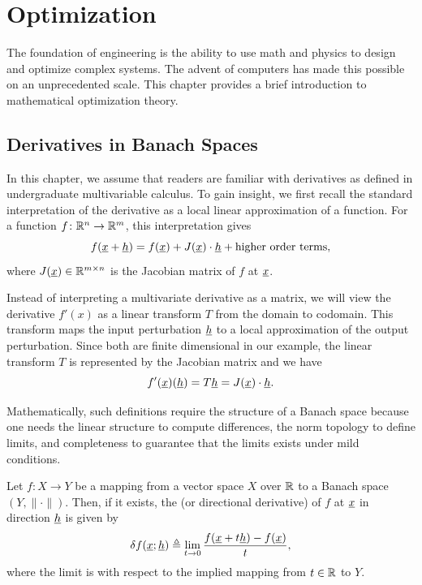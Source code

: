 \chapter{Optimization}



The foundation of engineering is the ability to use math and physics to design and optimize complex systems.
The advent of computers has made this possible on an unprecedented scale.
This chapter provides a brief introduction to mathematical optimization theory.

\section{Derivatives in Banach Spaces}

In this chapter, we assume that readers are familiar with derivatives as defined in undergraduate multivariable calculus.
To gain insight, we first recall the standard interpretation of the derivative as a local linear approximation of a function.
For a function $f\colon \mathbb{R}^n \to \mathbb{R}^m$, this interpretation gives 
\[ f(\underline{x} + \underline{h}) = f(\underline{x}) + J(\underline{x}) \cdot \underline{h} + \text{higher order terms}, \]
where $J(\underline{x})\in \mathbb{R}^{m\times n}$ is the Jacobian matrix of $f$ at $\underline{x}$.

Instead of interpreting a multivariate derivative as a matrix,  we will view the derivative $f'(x)$ as a linear transform $T$ from the domain to codomain.
This transform maps the input perturbation $\underline{h}$ to a local approximation of the output perturbation.
Since both are finite dimensional in our example, the linear transform $T$ is represented by the Jacobian matrix and we have $$f'(\underline{x})(\underline{h}) = T \underline{h} = J(\underline{x})\cdot \underline{h}.$$ 

Mathematically, such definitions require the structure of a Banach space because one needs the linear structure to compute differences, the norm topology to define limits, and completeness to guarantee that the limits exists under mild conditions.

\begin{definition}
Let $f \colon X \rightarrow Y$ be a mapping from a vector space $X$ over $\mathbb{R}$ to a Banach space $(Y,\|\cdot\|)$.
Then, if it exists, the  (or directional derivative) of $f$ at $\underline{x}$ in direction $\underline{h}$ is given by
\[ \delta f (\underline{x};\underline{h}) \triangleq \lim_{t \to 0} \frac{f(\underline{x}+t \underline{h}) - f(\underline{x})}{t}, \]
where the limit is with respect to the implied mapping from $t\in \mathbb{R}$ to $Y$.
\end{definition}

